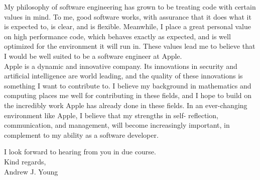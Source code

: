 \documentclass{article}
\begin{document}
My philosophy of software engineering has grown to be treating code with
certain values in mind. To me, good software works, with assurance that it does
what it is expected to, is clear, and is flexible. Meanwhile, I place a great
personal value on high performance code, which behaves exactly as expected, and
is well optimized for the environment it will run in. These values lead me to
believe that I would be well suited to be a software engineer at Apple.\\

Apple is a dynamic and innovative company. Its innovations in security and
artificial intelligence are world leading, and the quality of these innovations
is something I want to contribute to. I believe my background in mathematics
and computing places me well for contributing in these fields, and I hope to
build on the incredibly work Apple has already done in these fields. In an
ever-changing environment like Apple, I believe that my strengths in self-
reflection, communication, and management, will become increasingly important,
in complement to my ability as a software developer.

I look forward to hearing from you in due course.\\

Kind regards,\\

Andrew J. Young\\
\end{document}
